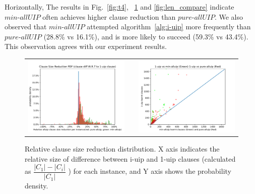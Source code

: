 \documentclass[runningheads]{llncs}
\newcommand{\fss}[2]{\fontsize{#1}{#2}\selectfont}
\newcommand{\allUipPure}{\textit{pure-allUIP}\xspace}
\newcommand{\allUipMin}{\textit{min-allUIP}\xspace}
\begin{document}
Horizontally, The results in Fig.~\ref{fig:t4}, ~\ref{fig:len_pdf} and \ref{fig:len_compare} indicate $\allUipMin$ often achieves higher clause reduction than $\allUipPure$. We also observed that $\allUipMin$
attempted algorithm~\ref{alg:i-uip} more frequently than $\allUipPure$ (28.8\% vs 16.1\%), and is more likely to succeed (59.3\% vs 43.4\%). This observation agrees with our experiment results. 

\begin{figure}[t!]
{\fss{8pt}{10pt}
\begin{tabular}[t]{l c l}
  
  \begin{minipage}[t]{0.5\textwidth}
   \includegraphics[width=\textwidth]{figures/clause_reduction_PDF}
   \caption{Relative clause size reduction distribution. X axis
      indicates the relative size of difference between i-uip and
      1-uip clauses (calculated as
      $\dfrac{|C_1|-|C_i|}{|C_1|}$ ) for
      each instance, and Y axis shows the probability density.}
       \label{fig:len_pdf}
  \end{minipage}
  & &
  \begin{minipage}[t]{0.5\textwidth}
    \includegraphics[width=\textwidth]{figures/clause_size_compare.pdf}

\end{minipage}
\end{tabular}}
\end{figure}
\end{document}
